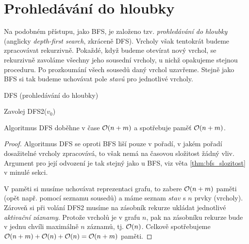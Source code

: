 \section{Prohledávání do hloubky}\label{sec:dfs}
Na podobném přístupu, jako BFS, je založeno tzv. \emph{prohledávání do hloubky} (anglicky \emph{depth-first search}, zkráceně DFS). Vrcholy však tentokrát budeme zpracovávat rekurzivně. Pokaždé, když budeme otevírat nový vrchol, se rekurzivně zavoláme všechny jeho sousední vrcholy, u nichž opakujeme stejnou proceduru. Po prozkoumání všech sousedů daný vrchol uzavřeme. Stejně jako BFS si tak budeme uchovávat pole \emph{stavů} pro jednotlivé vrcholy.
\begin{algorithm}\label{alg:dfs}
    \caption{DFS (prohledávání do hloubky)}
    Zavolej DFS2($v_0$)\\
\end{algorithm}

\begin{theorem}\label{thm:dfs_slozitost}
    Algoritmus DFS doběhne v čase $\mathcal{O}(n+m)$ a spotřebuje paměť $\mathcal{O}(n+m)$.
\end{theorem}
\begin{proof}
    Algoritmus DFS se oproti BFS liší pouze v pořadí, v jakém pořadí dosažitelné vrcholy zpracovává, to však nemá na časovou složitost žádný vliv. Argument pro její odvození je tak stejný jako u BFS, viz věta \ref{thm:bfs_slozitost} v minulé sekci.

    V paměti si musíme uchovávat reprezentaci grafu, to zabere $\mathcal{O}(n+m)$ paměti (opět např. pomocí seznamu sousedů) a máme seznam $stav$ s $n$ prvky (vrcholy). Zároveň si při volání \textsc{DFS2} musíme na zásobník rekurze ukládat jednotlivé \emph{aktivační záznamy}. Protože vrcholů je v grafu $n$, pak na zásobníku rekurze bude v jednu chvíli maximálně $n$ záznamů, tj. $\mathcal{O}(n)$. Celkově spotřebujeme $\mathcal{O}(n+m)+\mathcal{O}(n)+\mathcal{O}(n)=\mathcal{O}(n+m)$ paměti.
\end{proof}
